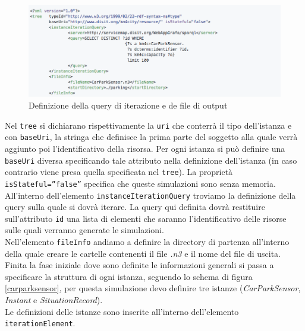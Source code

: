\documentclass[12pt,a4paper,italian]{article}
\begin{document}
\begin{figure}[h!]
	\centering
	\includegraphics[width=14cm]{img/esempio_p1.png}
	\caption{Definizione della query di iterazione e de file di output}\label{esempio1}
\end{figure}
Nel \texttt{tree} si dichiarano rispettivamente la \texttt{uri} che conterrà il tipo dell'istanza e con \texttt{baseUri}, la stringa che definisce la prima parte del soggetto alla quale verrà aggiunto poi l'identificativo della risorsa. Per ogni istanza si può definire una \texttt{baseUri} diversa specificando tale attributo nella definizione dell'istanza (in caso contrario viene presa quella specificata nel \texttt{tree}).
La proprietà \texttt{isStateful=''false''} specifica che queste simulazioni sono senza memoria.\\
\newline
All'interno dell'elemento \texttt{instanceIterationQuery} troviamo la definizione della query sulla quale si dovrà iterare. La query qui definita dovrà restituire sull'attributo \texttt{id} una lista di elementi che saranno l'identificativo delle risorse sulle quali verranno generate le simulazioni.\\
\newline
Nell'elemento \texttt{fileInfo} andiamo a definire la directory di partenza all'interno della quale creare le cartelle contenenti il file \emph{.n3} e il nome del file di uscita.\\
\newpage
Finita la fase iniziale dove sono definite le informazioni generali si passa a specificare la struttura di ogni istanza, seguendo lo schema di figura \ref{carparksensor}, per questa simulazione devo definire tre istanze (\emph{CarParkSensor}, \emph{Instant} e \emph{SituationRecord}).\\
Le definizioni delle istanze sono inserite all'interno dell'elemento\\ \texttt{iterationElement}.\\
\end{document}
